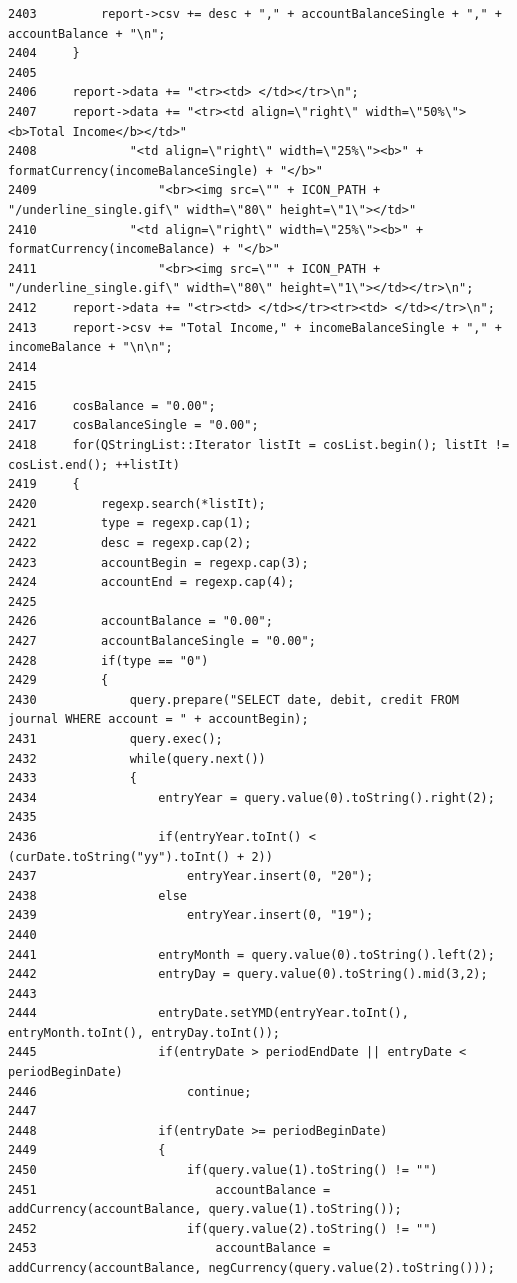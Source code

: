 \begin{verbatim}
2403         report->csv += desc + "," + accountBalanceSingle + "," + accountBalance + "\n";
2404     }
2405 
2406     report->data += "<tr><td> </td></tr>\n";
2407     report->data += "<tr><td align=\"right\" width=\"50%\"><b>Total Income</b></td>"
2408             "<td align=\"right\" width=\"25%\"><b>" + formatCurrency(incomeBalanceSingle) + "</b>"
2409                 "<br><img src=\"" + ICON_PATH + "/underline_single.gif\" width=\"80\" height=\"1\"></td>"
2410             "<td align=\"right\" width=\"25%\"><b>" + formatCurrency(incomeBalance) + "</b>"
2411                 "<br><img src=\"" + ICON_PATH + "/underline_single.gif\" width=\"80\" height=\"1\"></td></tr>\n";
2412     report->data += "<tr><td> </td></tr><tr><td> </td></tr>\n";
2413     report->csv += "Total Income," + incomeBalanceSingle + "," + incomeBalance + "\n\n";
2414 
2415 
2416     cosBalance = "0.00";
2417     cosBalanceSingle = "0.00";
2418     for(QStringList::Iterator listIt = cosList.begin(); listIt != cosList.end(); ++listIt)
2419     {
2420         regexp.search(*listIt);
2421         type = regexp.cap(1);
2422         desc = regexp.cap(2);
2423         accountBegin = regexp.cap(3);
2424         accountEnd = regexp.cap(4);
2425 
2426         accountBalance = "0.00";
2427         accountBalanceSingle = "0.00";
2428         if(type == "0")
2429         {
2430             query.prepare("SELECT date, debit, credit FROM journal WHERE account = " + accountBegin);
2431             query.exec();
2432             while(query.next())
2433             {
2434                 entryYear = query.value(0).toString().right(2);
2435 
2436                 if(entryYear.toInt() < (curDate.toString("yy").toInt() + 2))
2437                     entryYear.insert(0, "20");
2438                 else
2439                     entryYear.insert(0, "19");
2440 
2441                 entryMonth = query.value(0).toString().left(2);
2442                 entryDay = query.value(0).toString().mid(3,2);
2443 
2444                 entryDate.setYMD(entryYear.toInt(), entryMonth.toInt(), entryDay.toInt());
2445                 if(entryDate > periodEndDate || entryDate < periodBeginDate)
2446                     continue;
2447 
2448                 if(entryDate >= periodBeginDate)
2449                 {
2450                     if(query.value(1).toString() != "")
2451                         accountBalance = addCurrency(accountBalance, query.value(1).toString());
2452                     if(query.value(2).toString() != "")
2453                         accountBalance = addCurrency(accountBalance, negCurrency(query.value(2).toString()));

\end{verbatim}
